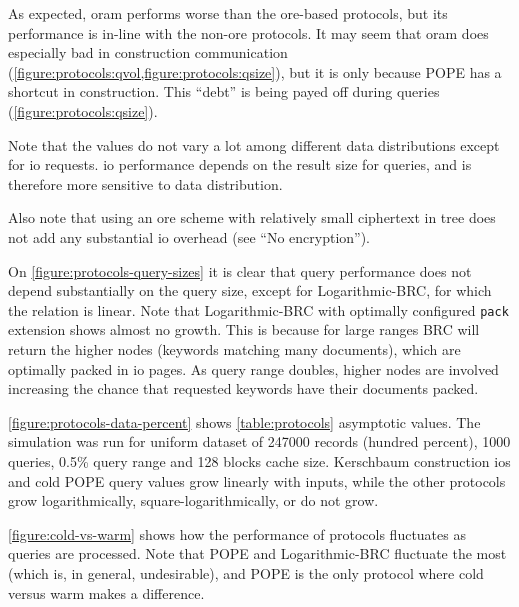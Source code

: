 			As expected, \acrshort{oram} performs worse than the \acrshort{ore}-based protocols, but its performance is in-line with the non-\acrshort{ore} protocols.
			It may seem that \acrshort{oram} does especially bad in construction communication (\cref{figure:protocols:qvol,figure:protocols:qsize}), but it is only because POPE has a shortcut in construction.
			This ``debt'' is being payed off during queries (\cref{figure:protocols:qsize}).

			Note that the values do not vary a lot among different data distributions except for \acrshort{io} requests.
			\acrshort{io} performance depends on the result size for queries, and is therefore more sensitive to data distribution.

			Also note that using an \acrshort{ore} scheme with relatively small ciphertext in {\BPlus} tree does not add any substantial \acrshort{io} overhead (see ``No encryption'').

			On \cref{figure:protocols-query-sizes} it is clear that query performance does not depend substantially on the query size, except for Logarithmic-BRC, for which the relation is linear.
			Note that Logarithmic-BRC with optimally configured \texttt{pack} extension shows almost no growth.
			This is because for large ranges BRC will return the higher nodes (keywords matching many documents), which are optimally packed in \acrshort{io} pages.
			As query range doubles, higher nodes are involved increasing the chance that requested keywords have their documents packed.

			

			\cref{figure:protocols-data-percent} shows \cref{table:protocols} asymptotic values.
			The simulation was run for uniform dataset of 247000 records (hundred percent), 1000 queries, 0.5\% query range and 128 blocks cache size.
			Kerschbaum construction \acrshort{io}s and cold POPE query values grow linearly with inputs, while the other protocols grow logarithmically, square-logarithmically, or do not grow.

			\cref{figure:cold-vs-warm} shows how the performance of protocols fluctuates as queries are processed.
			Note that POPE and Logarithmic-BRC fluctuate the most (which is, in general, undesirable), and POPE is the only protocol where cold versus warm makes a difference.
